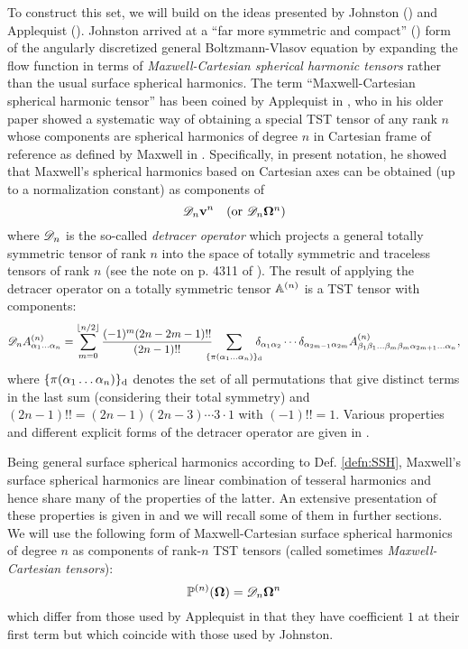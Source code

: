 To construct this set, we will build on the ideas presented by Johnston (\cite{Johnston1}) and Applequist
(\cite{Applequist1}). Johnston arrived at a ``far more symmetric and compact'' (\cite[p. 1455]{Johnston1}) form of the
angularly discretized general Boltzmann-Vlasov equation by expanding the flow function in terms of
\textit{Maxwell-Cartesian spherical harmonic tensors} rather than the usual surface spherical harmonics. The term
``Maxwell-Cartesian spherical harmonic tensor'' has been coined by Applequist in \cite{Applequist2}, who in his older
paper \cite{Applequist1} showed a systematic way of obtaining a special TST tensor of any rank $n$ whose components are
spherical harmonics of degree $n$ in Cartesian frame of reference as defined by Maxwell in \cite[p. 160]{Maxwell}.
Specifically, in present notation, he showed that Maxwell's spherical harmonics based on Cartesian axes can be obtained
(up to a normalization constant) as components of $$
  \detr \bv^n \quad \mbox{(or $\detr \bomega^n$)}
$$ where $\detr$ is the so-called \textit{detracer operator} which projects a general totally symmetric tensor of rank
$n$ into the space of totally symmetric and traceless tensors of rank $n$ (see the note on p. 4311 of
\cite{Applequist1}). The result of applying the detracer operator on a totally symmetric tensor $\AA$ is a TST tensor
with components:
\begin{equation}\label{eq:detr}
  \detr \AAA{\alpha_1\ldots\alpha_n} = \suma[m]{0}{\lfloor n/2 \rfloor} \frac{(-1)^m(2n-2m-1)!! }{(2n-1)!!}\quad\sum_{\mathclap{\{\perm{\alpha_1\ldots\alpha_n}\}_{\text{d}}}}\quad\kron{\alpha_1}{\alpha_2}\cdots\kron{\alpha_{2m-1}}{\alpha_{2m}}\AAA{\beta_1\beta_1\ldots\beta_m\beta_m\alpha_{2m+1}\ldots\alpha_n},
\end{equation}
where $\{\perm{\alpha_1\ldots\alpha_n}\}_{\text{d}}$ denotes the set of all permutations that give distinct terms in 
the last sum (considering their total symmetry) and $(2n-1)!! = (2n-1)(2n-3)\cdots 3\cdot 1$ with $(-1)!! = 1$. Various 
properties and different explicit forms of the detracer operator are given in \cite[Sec. 5]{Applequist1}
.

Being general surface spherical harmonics according to Def. \ref{defn:SSH}, Maxwell's surface spherical harmonics are
linear combination of tesseral harmonics and hence share many of the properties of the latter. An extensive presentation
of these properties is given in \cite{Applequist1,Applequist2} and we will recall some of them in further sections. We
will use the following form of Maxwell-Cartesian surface spherical harmonics of degree $n$ as components of rank-$n$ TST
tensors (called sometimes \textit{Maxwell-Cartesian tensors}):
\begin{equation}\label{eq:MCSH}
  \PP(\bomega) = \detr \bomega^n
\end{equation}
which differ from those used by Applequist in that they have coefficient $1$ at their first term but which coincide 
with those used by Johnston. 
 
